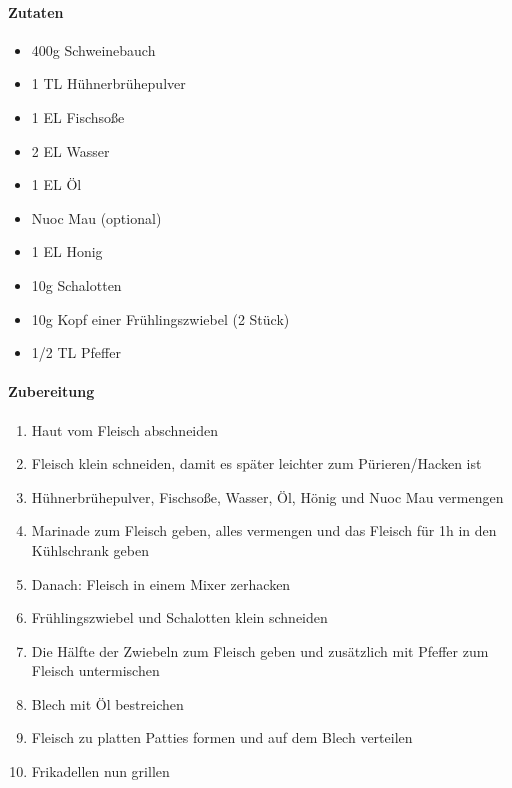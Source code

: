 \newpage
{}
\paragraph{Zutaten}
\begin{itemize}[noitemsep]
	\item 400g Schweinebauch
	\item 1 TL Hühnerbrühepulver
	\item 1 EL Fischsoße
	\item 2 EL Wasser
	\item 1 EL Öl
	\item Nuoc Mau (optional)
	\item 1 EL Honig
	\item 10g Schalotten 
	\item 10g Kopf einer Frühlingszwiebel (2 Stück)
	\item 1/2 TL Pfeffer
\end{itemize}


\paragraph{Zubereitung}
\begin{enumerate}[noitemsep]
	\item Haut vom Fleisch abschneiden
	\item Fleisch klein schneiden, damit es später leichter zum Pürieren/Hacken ist
	\item Hühnerbrühepulver, Fischsoße, Wasser, Öl, Hönig und Nuoc Mau vermengen
	\item Marinade zum Fleisch geben, alles vermengen und das Fleisch für 1h in den Kühlschrank geben
	\item Danach: Fleisch in einem Mixer zerhacken
	\item Frühlingszwiebel und Schalotten klein schneiden
	\item Die Hälfte der Zwiebeln zum Fleisch geben und zusätzlich mit Pfeffer zum Fleisch untermischen
	\item Blech mit Öl bestreichen
	\item Fleisch zu platten Patties formen und auf dem Blech verteilen
	\item Frikadellen nun grillen
\end{enumerate}